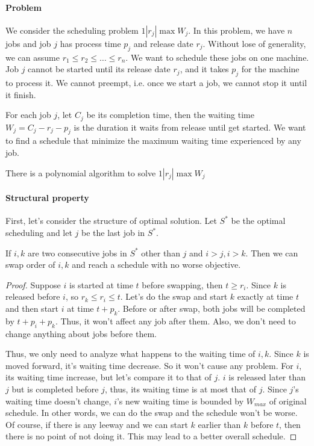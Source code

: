 \paragraph{Problem}
We consider the scheduling problem $1 | r_j | \max W_j$.
In this problem, we have $n$ jobs and job $j$ has process time $p_j$ and release date $r_j$.
Without lose of generality, we can assume $r_1 \le r_2 \le \ldots \le r_n$.
We want to schedule these jobs on one machine.
Job $j$ cannot be started until its release date $r_j$, and it takes $p_j$ for the machine to process it.
We cannot preempt, i.e. once we start a job, we cannot stop it until it finish.

For each job $j$, let $C_j$ be its completion time,
then the waiting time $W_j = C_j - r_j - p_j$ is the duration it waits from release until get started.
We want to find a schedule that minimize the maximum waiting time experienced by any job.

\begin{thm}
There is a polynomial algorithm to solve $1 | r_j | \max W_j$
\end{thm}

\paragraph{Structural property}
First, let's consider the structure of optimal solution.
Let $S^*$ be the optimal scheduling and let $j$ be the last job in $S^*$.

\begin{lem}
If $i, k$ are two consecutive jobs in $S^*$ other than $j$ and $i > j, i > k$.
Then we can swap order of $i,k$ and reach a schedule with no worse objective.
\end{lem}
\begin{proof}
Suppose $i$ is started at time $t$ before swapping, then $t \ge r_i$.
Since $k$ is released before $i$, so $r_k \le r_i \le t$.
Let's do the swap and start $k$ exactly at time $t$ and then start $i$ at time $t + p_k$.
Before or after swap, both jobs will be completed by $t + p_i + p_k$.
Thus, it won't affect any job after them. Also, we don't need to change anything about jobs before them.

Thus, we only need to analyze what happens to the waiting time of $i,k$.
Since $k$ is moved forward, it's waiting time decrease. So it won't cause any problem.
For $i$, its waiting time increase, but let's compare it to that of $j$.
$i$ is released later than $j$ but is completed before $j$, thus, its waiting time is at most that of $j$.
Since $j$'s waiting time doesn't change, $i$'s new waiting time is bounded by $W_{max}$ of original schedule.
In other words, we can do the swap and the schedule won't be worse.
Of course, if there is any leeway and we can start $k$ earlier than $k$ before $t$,
then there is no point of not doing it. This may lead to a better overall schedule.
\end{proof}

